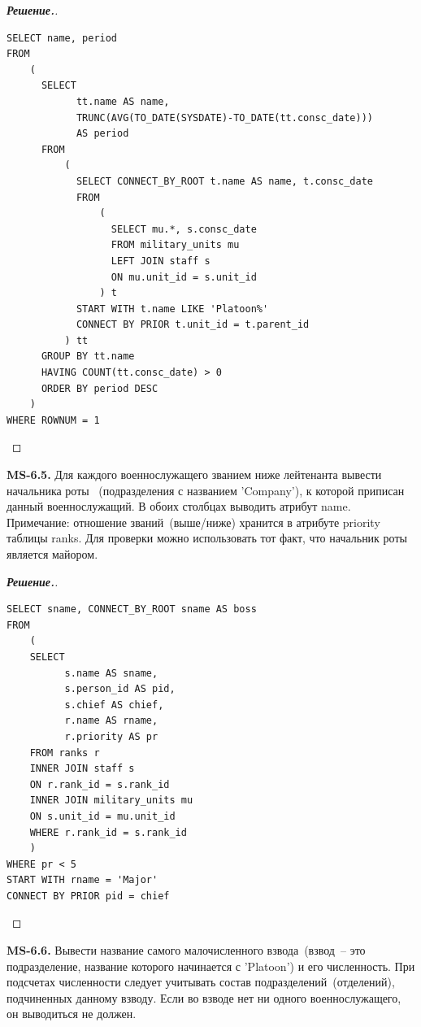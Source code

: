 \documentclass[a4paper]{article}
\newcommand{\MYlvm}{\leavevmode\vspace{-0.3cm}}		%
\begin{document}
\begin{proof}[{\bf Решение.}]\MYlvm\\
\begin{lstlisting}
SELECT name, period
FROM 
    (
      SELECT 
            tt.name AS name, 
            TRUNC(AVG(TO_DATE(SYSDATE)-TO_DATE(tt.consc_date))) 
            AS period
      FROM
          ( 
            SELECT CONNECT_BY_ROOT t.name AS name, t.consc_date
            FROM
                ( 
                  SELECT mu.*, s.consc_date
                  FROM military_units mu 
                  LEFT JOIN staff s 
                  ON mu.unit_id = s.unit_id 
                ) t
            START WITH t.name LIKE 'Platoon%'
            CONNECT BY PRIOR t.unit_id = t.parent_id 
          ) tt
      GROUP BY tt.name
      HAVING COUNT(tt.consc_date) > 0
      ORDER BY period DESC
    )
WHERE ROWNUM = 1
\end{lstlisting}
\end{proof}


\noindent
{\bf MS-6.5.}
Для каждого военнослужащего званием ниже лейтенанта вывести начальника роты~ 
(подразделения с названием 'Company'), к которой приписан данный военнослужащий.
В обоих столбцах выводить атрибут name.
Примечание: отношение званий~(выше/ниже) хранится в атрибуте priority таблицы 
ranks. Для проверки можно использовать тот факт, что начальник роты является 
майором.

\begin{proof}[{\bf Решение.}]\MYlvm\\
\begin{lstlisting}
SELECT sname, CONNECT_BY_ROOT sname AS boss
FROM
    (
    SELECT 
          s.name AS sname, 
          s.person_id AS pid,
          s.chief AS chief,
          r.name AS rname,
          r.priority AS pr      
    FROM ranks r 
    INNER JOIN staff s 
    ON r.rank_id = s.rank_id
    INNER JOIN military_units mu
    ON s.unit_id = mu.unit_id
    WHERE r.rank_id = s.rank_id 
    ) 
WHERE pr < 5
START WITH rname = 'Major'
CONNECT BY PRIOR pid = chief 
\end{lstlisting}
\end{proof}


\noindent
{\bf MS-6.6.}
Вывести название самого малочисленного взвода~(взвод~-- это подразделение, 
название которого начинается с 'Platoon') и его численность.
При подсчетах численности следует учитывать состав подразделений~(отделений), 
подчиненных данному взводу. Если во взводе нет ни одного военнослужащего, 
он выводиться не должен.
\end{document}
